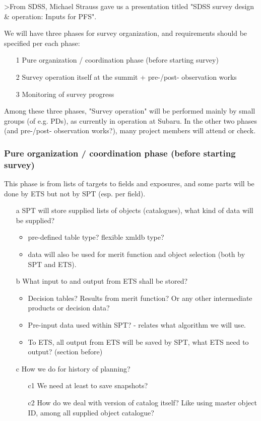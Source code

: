 \documentclass[a4paper,notitlepage]{article}
\begin{document}
>From SDSS, Michael Strauss gave us a presentation titled "SDSS survey design 
\& operation: Inputs for PFS". 

We will have three phases for survey organization, and requirements should be 
specified per each phase: 
\begin{enumerate}
  \item[1] Pure organization / coordination phase (before starting survey)
  \item[2] Survey operation itself at the summit + pre-/post- observation works
  \item[3] Monitoring of survey progress
\end{enumerate}
Among these three phases, "Survey operation" will be performed mainly by small 
groups (of e.g. PDs), as currently in operation at Subaru. In the other two 
phases (and pre-/post- observation works?), many project members will attend 
or check.



\subsubsection{Pure organization / coordination phase (before starting survey)}

This phase is from lists of targets to fields and exposures, 
and some parts will be done by ETS but not by SPT (esp. per field). 

\begin{enumerate}
  \item[a] SPT will store supplied lists of objects (catalogues), what kind 
    of data will be supplied? 
    \begin{itemize}
      \item pre-defined table type? flexible xmldb type?
      \item data will also be used for merit function and object selection 
        (both by SPT and ETS).
    \end{itemize}
  \item[b] What input to and output from ETS shall be stored?
    \begin{itemize}
      \item Decision tables? Results from merit function? Or any other 
        intermediate products or decision data?
      \item Pre-input data used within SPT? - relates what algorithm we will use.
      \item To ETS, all output from ETS will be saved by SPT, what ETS need 
        to output? (section before)
    \end{itemize}
  \item[c] How we do for history of planning?
    \begin{enumerate}
      \item[c1] We need at least to save snapshots?
      \item[c2] How do we deal with version of catalog itself? Like using master 
        object ID, among all supplied object catalogue?
    \end{enumerate}
\end{enumerate}
\end{document}
